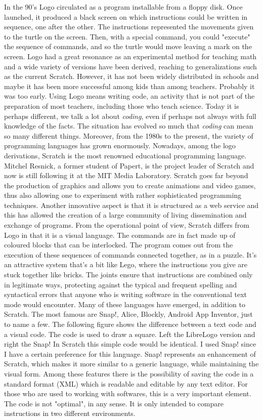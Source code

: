 In the 90's Logo circulated as a program installable from a floppy disk. Once launched, it produced a black screen on which instructions could be written in sequence, one after the other. The instructions represented the movements given to the turtle on the screen. Then, with a special command, you could "execute" the sequence of commands, and so the turtle would move leaving a mark on the screen. Logo had a great resonance as an experimental method for teaching math and a wide variety of versions have been derived, reaching to generalizations such as the current Scratch. However, it has not been widely distributed in schools and maybe it has been more successful among kids than among teachers. Probably it was too early. Using Logo means writing code, an activity that is not part of the preparation of most teachers, including those who teach science. Today it is perhaps different, we talk a lot about \textit{coding}, even if perhaps not always with full knowledge of the facts. The situation has evolved so much that \textit{coding} can mean so many different things. Moreover, from the 1980s to the present, the variety of programming languages has grown enormously. Nowadays, among the logo derivations, Scratch is the most renowned educational programming language. Mitchel Resnick, a former student of Papert, is the project leader of Scratch and now is still following it at the MIT Media Laboratory. Scratch goes far beyond the production of graphics and allows you to create animations and video games, thus also allowing one to experiment with rather sophisticated programming techniques. Another innovative aspect is that it is structured as a web service and this has allowed the creation of a large community of living dissemination and exchange of programs. From the operational point of view, Scratch differs from Logo in that it is a visual language. The commands are in fact made up of coloured blocks that can be interlocked. The program comes out from the execution of these sequences of commands connected together, as in a puzzle. It's an attractive system that's a bit like Lego, where the instructions you give are stuck together like bricks. The joints ensure that instructions are combined only in legitimate ways, protecting against the typical and frequent spelling and syntactical errors that anyone who is writing software in the conventional text mode would encounter. Many of these languages have emerged, in addition to Scratch. The most famous are Snap!, Alice, Blockly, Android App Inventor, just to name a few. The following figure shows the difference between a text code and a visual code. The code is used to draw a square. Left the LibreLogo version and right the Snap! In Scratch this simple code would be identical. I used Snap! since I have a certain preference for this language. Snap! represents an enhancement of Scratch, which makes it more similar to a generic language, while maintaining the visual form. Among these features there is the possibility of saving  the code in a standard format (XML) which is readable and editable by any text editor. For those who are used to working with softwares, this is a very important element. The code is not "optimal", in any sense. It is only intended to compare instructions in two different environments. 


